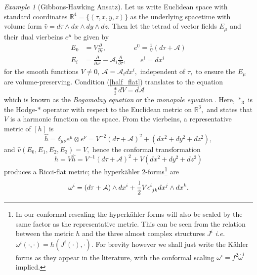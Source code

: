 \documentclass[a4paper,12pt, onecolumn, notitlepage]{article}
\theoremstyle{definition}
\theoremstyle{remark}
\newtheorem{ex}[thm]{Example}
\newcommand{\ie}{\emph{i.e.} }
\newcommand{\w}{\omega}
\newcommand{\m}{\mu}
\newcommand{\n}{\nu}
\newcommand{\e}{\epsilon}
\newcommand{\ddt}[1]{\frac{\partial #1}{\partial \tau}}
\newcommand{\dd}[2]{\frac{\partial #1}{\partial #2}}
\newcommand{\K}{K\"ahler }
\newcommand{\HK}{hyperk\"ahler }
\newcommand{\x}[1]{x^{#1}}
\newcommand{\R}{\mathbb{R}}
\begin{document}
\begin{ex}[Gibbons-Hawking Ansatz]
	Let us write Euclidean space with standard coordinates $\R^{4} = \{(\tau,x,y,z)\}$ as the underlying spacetime with volume form $\hat{v}=d\tau\wedge dx\wedge dy\wedge dz.$ Then let the tetrad of vector fields $E_{\m}$ and their dual vierbeins $e^{\m}$ be given by
	\begin{align*}
	\label{gh_vectors}
		E_{0} &= V\dd{}{\tau},\qquad\qquad e^{0} = \frac{1}{V}(d\tau+\mathcal{A})\\
		E_{i} &= \dd{}{\x{i}} - \mathcal{A}_{i}\ddt{},\qquad e^{i} = dx^{i}
	\end{align*}
	for the smooth functions $V\neq0,\ \mathcal{A} = \mathcal{A}_{i}dx^{i},$ independent of $\tau,$ to  ensure the $E_{\m}$ are volume-preserving. Condition (\ref{half_flat}) translates to the equation
	\begin{equation}
	\label{monopole}
		\underset{3}\ast dV = d\mathcal{A}
	\end{equation}
	which is known as the 
	\emph{Bogomolny equation} or the \emph{monopole equation} \cite{solitons}. Here, $\ast_{3}$ is the Hodge-$\ast$ operator with respect to the Euclidean metric on $\R^{3},$ and states that $V$ is a harmonic function on the space. From the vierbeins, a representative metric of $[h]$ is
	\begin{equation*}
		\hat{h}=\delta_{\m\n}e^{\m}\otimes e^{\n} = V^{-2}(d\tau + \mathcal{A})^{2} + (dx^{2} + dy^{2} + dz^{2}),
	\end{equation*}
	and $\hat{v}(E_{0},E_{1},E_{2},E_{3})=V,$ hence the conformal transformation
	\begin{equation}
		\label{gh_metric}
		h = V\hat{h} =  V^{-1}(d\tau + \mathcal{A})^{2} + V(dx^{2} + dy^{2} + dz^{2})
	\end{equation}
	produces a Ricci-flat metric; 
	the \HK 2-forms\footnote{In our conformal rescaling the \HK forms will also be scaled by the same factor as the representative metric. This can be seen from the relation between the metric $h$ and the three almost complex structures $J^{i}$ \ie $\w^{i}(\cdot,\cdot) = h(J^{i}(\cdot),\cdot).$ For brevity however we shall just write the \K forms as they appear in the literature, with the conformal scaling $\w^{i} = f^{2}\hat{\w}^{i}$ implied.} are
	\begin{equation}
	\label{gh_forms}
		\w\indices{^i} = (d\tau + \mathcal{A})\wedge dx\indices{^i} + \frac{1}{2}V\e\indices{^i_j_k}dx\indices{^j}\wedge dx\indices{^k}.
	\end{equation}

\end{ex}
\end{document}
